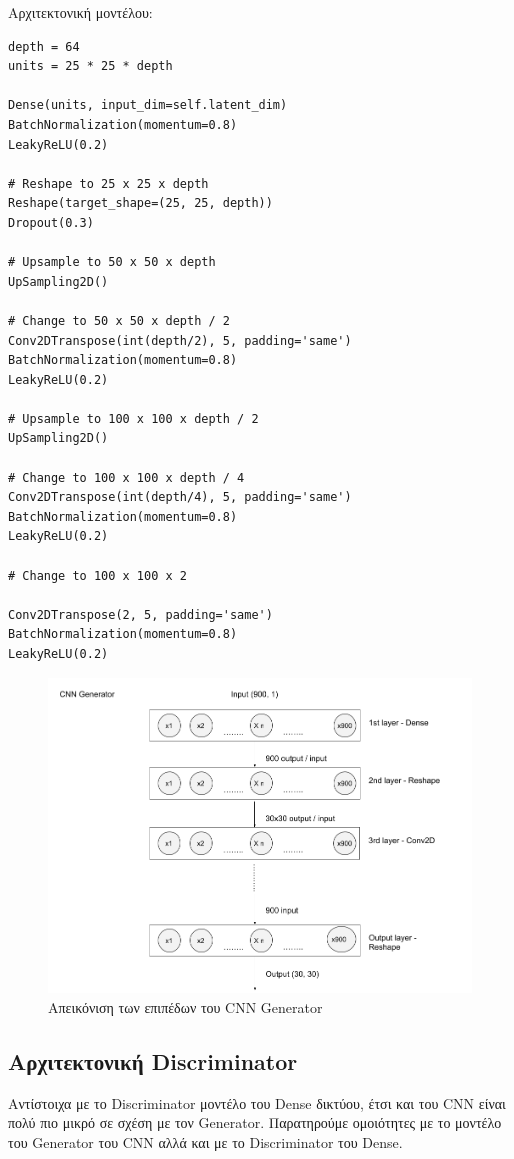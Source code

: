 Αρχιτεκτονική μοντέλου:
\begin{verbatim}
depth = 64
units = 25 * 25 * depth
        
Dense(units, input_dim=self.latent_dim)
BatchNormalization(momentum=0.8)
LeakyReLU(0.2)

# Reshape to 25 x 25 x depth
Reshape(target_shape=(25, 25, depth))
Dropout(0.3)

# Upsample to 50 x 50 x depth
UpSampling2D()

# Change to 50 x 50 x depth / 2
Conv2DTranspose(int(depth/2), 5, padding='same')
BatchNormalization(momentum=0.8)
LeakyReLU(0.2)

# Upsample to 100 x 100 x depth / 2
UpSampling2D()

# Change to 100 x 100 x depth / 4
Conv2DTranspose(int(depth/4), 5, padding='same')
BatchNormalization(momentum=0.8)
LeakyReLU(0.2)

# Change to 100 x 100 x 2
        
Conv2DTranspose(2, 5, padding='same')
BatchNormalization(momentum=0.8)
LeakyReLU(0.2)
\end{verbatim}

\begin{figure}[H]
\centering
\includegraphics[width=.8\linewidth]{../images/graphs/CNN_generator.png}
\caption{Απεικόνιση των επιπέδων του CNN Generator}
\label{fig:fig}
\end{figure}


\subsection{Αρχιτεκτονική Discriminator}
Αντίστοιχα με το Discriminator μοντέλο του Dense δικτύου, έτσι και του CNN είναι πολύ πιο μικρό σε σχέση με τον Generator. Παρατηρούμε ομοιότητες με το μοντέλο του Generator του CNN αλλά και με το Discriminator του Dense.

